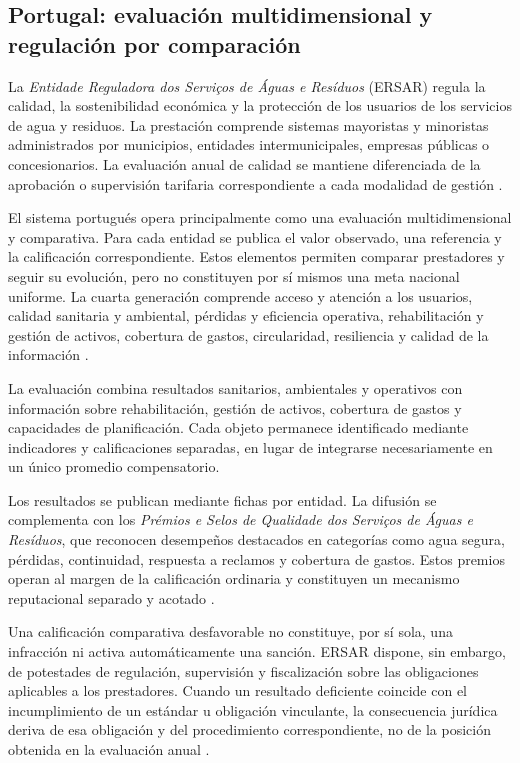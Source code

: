 \subsection{Portugal: evaluación multidimensional y regulación por comparación}
\label{anexo:portugal}

La \emph{Entidade Reguladora dos Serviços de Águas e Resíduos} (ERSAR) regula la calidad, la sostenibilidad económica y la protección de los usuarios de los servicios de agua y residuos. La prestación comprende sistemas mayoristas y minoristas administrados por municipios, entidades intermunicipales, empresas públicas o concesionarios. La evaluación anual de calidad se mantiene diferenciada de la aprobación o supervisión tarifaria correspondiente a cada modalidad de gestión \citep{ERSAR2025RASARP,ERSAR2026Mision,ERSAR2026Tarifas}.

El sistema portugués opera principalmente como una evaluación multidimensional y comparativa. Para cada entidad se publica el valor observado, una referencia y la calificación correspondiente. Estos elementos permiten comparar prestadores y seguir su evolución, pero no constituyen por sí mismos una meta nacional uniforme. La cuarta generación comprende acceso y atención a los usuarios, calidad sanitaria y ambiental, pérdidas y eficiencia operativa, rehabilitación y gestión de activos, cobertura de gastos, circularidad, resiliencia y calidad de la información \citep{ERSAR2021Guia27,ERSAR2026Qualidade}.

La evaluación combina resultados sanitarios, ambientales y operativos con información sobre rehabilitación, gestión de activos, cobertura de gastos y capacidades de planificación. Cada objeto permanece identificado mediante indicadores y calificaciones separadas, en lugar de integrarse necesariamente en un único promedio compensatorio.

Los resultados se publican mediante fichas por entidad. La difusión se complementa con los \emph{Prémios e Selos de Qualidade dos Serviços de Águas e Resíduos}, que reconocen desempeños destacados en categorías como agua segura, pérdidas, continuidad, respuesta a reclamos y cobertura de gastos. Estos premios operan al margen de la calificación ordinaria y constituyen un mecanismo reputacional separado y acotado \citep{ERSAR2026Pesquisa,ERSAR2026Premios}.

Una calificación comparativa desfavorable no constituye, por sí sola, una infracción ni activa automáticamente una sanción. ERSAR dispone, sin embargo, de potestades de regulación, supervisión y fiscalización sobre las obligaciones aplicables a los prestadores. Cuando un resultado deficiente coincide con el incumplimiento de un estándar u obligación vinculante, la consecuencia jurídica deriva de esa obligación y del procedimiento correspondiente, no de la posición obtenida en la evaluación anual \citep{ERSAR2026Mision,ERSAR2026Qualidade}.

